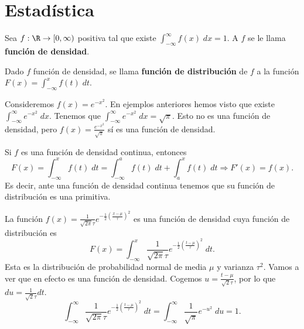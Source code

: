 \section{Estadística}
\begin{fdefinition}[]
\normalfont Sea $\displaystyle f : \R \to [0,\infty) $ positiva tal que existe $\displaystyle \int^{\infty}_{-\infty} f\left(x\right) \; dx = 1 $. A $\displaystyle f $ se le llama \textbf{función de densidad}. 
\end{fdefinition}
\begin{fdefinition}[]
\normalfont Dado $\displaystyle f $ función de densidad, se llama \textbf{función de distribución} de $\displaystyle f $ a la función $\displaystyle F\left(x\right) = \int^{x}_{-\infty} f\left(t\right) \; dt $.
\end{fdefinition}
\begin{eg}
\normalfont Consideremos $\displaystyle f\left(x\right) = e^{-x^{2}} $. En ejemplos anteriores hemos visto que existe $\displaystyle \int^{\infty}_{-\infty} e^{-x^{2}} \; dx $. Tenemos que $\displaystyle \int^{\infty}_{-\infty} e^{-x^{2}} \; dx = \sqrt{\pi } $. Esto no es una función de densidad, pero $\displaystyle f\left(x\right) = \frac{e^{-x^{2}}}{\sqrt{\pi }} $ sí es una función de densidad.
\end{eg}
\begin{observation}
\normalfont Si $\displaystyle f $ es una función de densidad continua, entonces 
\[ F\left(x\right) = \int^{x}_{-\infty} f\left(t\right) \; dt = \int^{a}_{-\infty} f\left(t\right) \; dt + \int^{x}_{a} f\left(t\right) \; dt \Rightarrow F'\left(x\right) = f\left(x\right) .\]
Es decir, ante una función de densidad continua tenemos que su función de distribución es una primitiva.
\end{observation}
\begin{eg}
\normalfont La función $\displaystyle f\left(x\right) = \frac{1}{\sqrt{2\pi }\tau }e^{-\frac{1}{2}\left(\frac{x-\mu }{\tau }\right)^{2}} $ es una función de densidad cuya función de distribución es
\[F\left(x\right) = \int^{x}_{-\infty} \frac{1}{\sqrt{2\pi }\tau } e^{-\frac{1}{2}\left(\frac{t-\mu }{\tau }\right)^{2}}\; dt .\]
Esta es la distribución de probabilidad normal de media $\displaystyle \mu $ y varianza $\displaystyle \tau^{2} $. Vamos a ver que en efecto es una función de densidad. Cogemos $\displaystyle u = \frac{t - \mu }{\sqrt{2}\tau } $, por lo que $\displaystyle du = \frac{1}{\sqrt{2}\tau }dt $.
\[\int^{\infty}_{-\infty} \frac{1}{\sqrt{2\pi }\tau }e^{-\frac{1}{2}\left(\frac{t-\mu}{\tau}\right)^{2}} \; dt = \int^{\infty}_{-\infty} \frac{1}{\sqrt{\pi }}e^{-u^{2}} \; du = 1 .\]
\end{eg}
